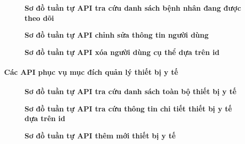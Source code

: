\begin{figure}[H]
	\centering
	\caption[Sơ đồ tuần tự API tra cứu danh sách bệnh nhân đang được theo dõi]{\bfseries \fontsize{12pt}{0pt}\selectfont Sơ đồ tuần tự API tra cứu danh sách bệnh nhân đang được theo dõi}
	\label{sequence_diagram_get_patient_data}
\end{figure}

\begin{figure}[H]
	\centering
	\caption[Sơ đồ tuần tự API chỉnh sửa thông tin người dùng]{\bfseries \fontsize{12pt}{0pt}\selectfont Sơ đồ tuần tự API chỉnh sửa thông tin người dùng}
	\label{sequence_diagram_update_user}
\end{figure}

\begin{figure}[H]
	\centering
	\caption[Sơ đồ tuần tự API xóa người dùng cụ thể dựa trên id]{\bfseries \fontsize{12pt}{0pt}\selectfont Sơ đồ tuần tự API xóa người dùng cụ thể dựa trên id}
	\label{sequence_diagram_delete_user}
\end{figure}

\paragraph{Các API phục vụ mục đích quản lý thiết bị y tế}
\begin{figure}[H]
	\centering
	\caption[Sơ đồ tuần tự API tra cứu danh sách toàn bộ thiết bị y tế]{\bfseries \fontsize{12pt}{0pt}\selectfont Sơ đồ tuần tự API tra cứu danh sách toàn bộ thiết bị y tế}
	\label{sequence_diagram_get_all_devices}
\end{figure}

\begin{figure}[H]
	\centering
	\caption[Sơ đồ tuần tự API tra cứu thông tin chi tiết thiết bị y tế dựa trên id]{\bfseries \fontsize{12pt}{0pt}\selectfont Sơ đồ tuần tự API tra cứu thông tin chi tiết thiết bị y tế dựa trên id}
	\label{sequence_diagram_get_device_by_id}
\end{figure}

\begin{figure}[H]
	\centering
	\caption[Sơ đồ tuần tự API thêm mới thiết bị y tế]{\bfseries \fontsize{12pt}{0pt}\selectfont Sơ đồ tuần tự API thêm mới thiết bị y tế}
	\label{sequence_diagram_add_device}
\end{figure}

